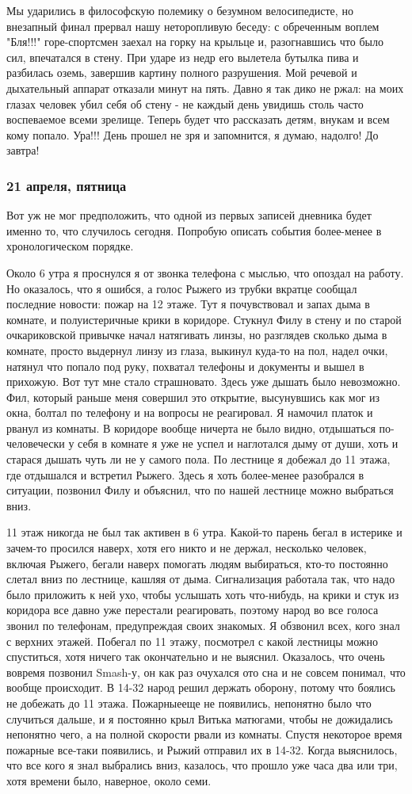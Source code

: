 \documentclass[12pt,a4paper]{article}
\newcommand{\ssubsection}[1]{
	\subsubsection*{#1}
	\addcontentsline{toc}{subsubsection}{#1}
}
\begin{document}
Мы ударились в философскую полемику о безумном велосипедисте, но внезапный финал прервал нашу неторопливую беседу: с обреченным воплем "Бля!!!" горе-спортсмен заехал на горку на крыльце и, разогнавшись что было сил, впечатался в стену. При ударе из недр его вылетела бутылка пива и разбилась оземь, завершив картину полного разрушения. Мой речевой и дыхательный аппарат отказали минут на пять. Давно я так дико не ржал: на моих глазах человек убил себя об стену - не каждый день увидишь столь часто воспеваемое всеми зрелище. Теперь будет что рассказать детям, внукам и всем кому попало. Ура!!! День прошел не зря и запомнится, я думаю, надолго! До завтра!

\ssubsection{21 апреля, пятница}
Вот уж не мог предположить, что одной из первых записей дневника будет именно то, что случилось сегодня. Попробую описать события более-менее в хронологическом порядке.

Около 6 утра я проснулся я от звонка телефона с мыслью, что опоздал на работу. Но оказалось, что я ошибся, а голос Рыжего из трубки вкратце сообщал последние новости: пожар на 12 этаже. Тут я почувствовал и запах дыма в комнате, и полуистеричные крики в коридоре. Стукнул Филу в стену и по старой очкариковской привычке начал натягивать линзы, но разглядев сколько дыма в комнате, просто выдернул линзу из глаза, выкинул куда-то на пол, надел очки, натянул что попало под руку, похватал телефоны и документы и вышел в прихожую. Вот тут мне стало страшновато. Здесь уже дышать было невозможно. Фил, который раньше меня совершил это открытие, высунувшись как мог из окна, болтал по телефону и на вопросы не реагировал. Я намочил платок и рванул из комнаты. В коридоре вообще ничерта не было видно, отдышаться по-человечески у себя в комнате я уже не успел и наглотался дыму от души, хоть и старася дышать чуть ли не у самого пола. По лестнице я добежал до 11 этажа, где отдышался и встретил Рыжего. Здесь я хоть более-менее разобрался в ситуации, позвонил Филу и объяснил, что по нашей лестнице можно выбраться вниз.

11 этаж никогда не был так активен в 6 утра. Какой-то парень бегал в истерике и зачем-то просился наверх, хотя его никто и не держал, несколько человек, включая Рыжего, бегали наверх помогать людям выбираться, кто-то постоянно слетал вниз по лестнице, кашляя от дыма. Сигнализация работала так, что надо было приложить к ней ухо, чтобы услышать хоть что-нибудь, на крики и стук из коридора все давно уже перестали реагировать, поэтому народ во все голоса звонил по телефонам, предупреждая своих знакомых. Я обзвонил всех, кого знал с верхних этажей. Побегал по 11 этажу, посмотрел с какой лестницы можно спуститься, хотя ничего так окончательно и не выяснил. Оказалось, что очень вовремя позвонил Smash-у, он как раз очухался ото сна и не совсем понимал, что вообще происходит. В 14-32 народ решил держать оборону, потому что боялись не добежать до 11 этажа. Пожарныееще не появились, непонятно было что случиться дальше, и я постоянно крыл Витька матюгами, чтобы не дожидались непонятно чего, а на полной скорости рвали из комнаты. Спустя некоторое время пожарные все-таки появились, и Рыжий отправил их в 14-32. Когда выяснилось, что все кого я знал выбрались вниз, казалось, что прошло уже часа два или три, хотя времени было, наверное, около семи. 
\end{document}
